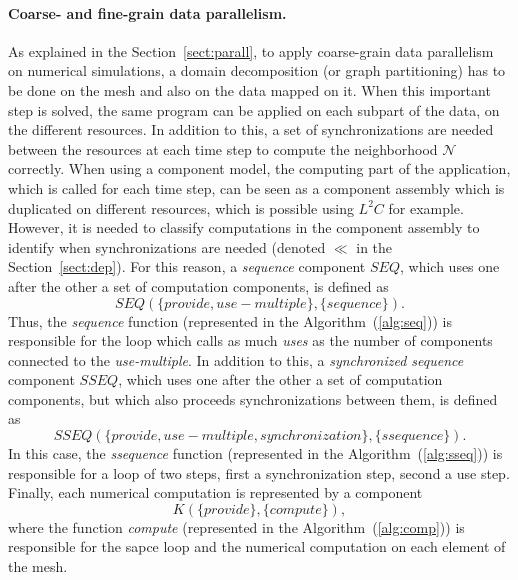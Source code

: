 \paragraph{Coarse- and fine-grain data parallelism.} 
As explained in the Section~\ref{sect:parall}, to apply coarse-grain data parallelism on numerical simulations, a domain decomposition (or graph partitioning) has to be done on the mesh and also on the data mapped on it. When this important step is solved, the same program can be applied on each subpart of the data, on the different resources. In addition to this, a set of synchronizations are needed between the resources at each time step to compute the neighborhood $\mathcal{N}$ correctly. When using a component model, the computing part of the application, which is called for each time step, can be seen as a component assembly which is duplicated on different resources, which is possible using $L^2C$ for example. However, it is needed to classify computations in the component assembly to identify when synchronizations are needed (denoted $\ll$ in the Section~\ref{sect:dep}). For this reason, a \textit{sequence} component $SEQ$, which uses one after the other a set of computation components, is defined as 
\begin{equation}
SEQ(\{provide,use-multiple\},\{sequence\}).
\end{equation} 
Thus, the \textit{sequence} function (represented in the Algorithm~(\ref{alg:seq})) is responsible for the loop which calls as much \textit{uses} as the number of components connected to the \textit{use-multiple}. In addition to this, a \textit{synchronized sequence} component $SSEQ$, which uses one after the other a set of computation components, but which also proceeds synchronizations between them, is defined as 
\begin{equation}
SSEQ(\{provide,use-multiple, synchronization\},\{ssequence\}).
\end{equation}
In this case, the \textit{ssequence} function (represented in the Algorithm~(\ref{alg:sseq})) is responsible for a loop of two steps, first a synchronization step, second a use step. Finally, each numerical computation is represented by a component 
\begin{equation}
K(\{provide\},\{compute\}),
\end{equation}
 where the function \textit{compute} (represented in the Algorithm~(\ref{alg:comp})) is responsible for the sapce loop and the numerical computation on each element of the mesh.


